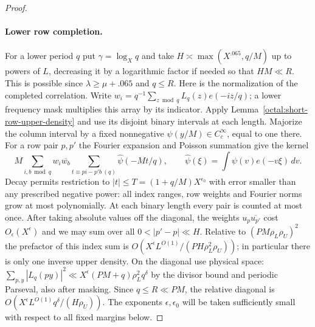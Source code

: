 \documentclass[11pt,a4paper]{article}
\theoremstyle{paperplain}
\numberwithin{equation}{section}
\begin{document}
\begin{proof}
\paragraph{Lower row completion.}
For a lower period $q$ put $\gamma=\log_X q$ and take
$H\asymp\max(X^{.065},q/M)$ up to powers of $L$, decreasing
it by a logarithmic factor if needed so that $HM\ll R$.
This is possible since $\lambda\ge\mu+.065$ and $q\le R$.
Here is the normalization of the completed correlation. Write
$w_i=q^{-1}\sum_{z\bmod q}L_q(z)e(-iz/q)$; a lower frequency mask
multiplies this array by its indicator. Apply
Lemma~\ref{octal:short-row-upper-density} and use its disjoint binary
intervals at each length. Majorize the column interval by a fixed
nonnegative $\psi(y/M)\in C_c^\infty$, equal to one there. For a row
pair $p,p'$ the Fourier expansion and Poisson summation give the kernel
\[
 M\sum_{i,b\bmod q}w_i\overline{w_b}
   \sum_{t\equiv pi-p'b\ (q)}\widehat\psi(-Mt/q),\qquad
 \widehat\psi(\xi)=\int\psi(v)e(-v\xi)\,dv .
\]
Decay permits restriction to $|t|\le T=(1+q/M)X^{\epsilon_0}$ with
error smaller than any prescribed negative power: all index ranges,
row weights and Fourier norms grow at most polynomially. At each
binary length every pair is counted at most once. After taking absolute
values off the diagonal, the weights $u_p\overline{u_{p'}}$ cost
$O_\epsilon(X^\epsilon)$ and we may sum over all $0<|p'-p|\ll H$.
Relative to $(PM\rho_L\rho_U)^2$ the prefactor of this index sum is
$O(X^\epsilon L^{O(1)}/(PH\rho_L^2\rho_U))$; in particular there is
only one inverse upper density. On the diagonal use physical space:
$\sum_{p,y}|L_q(py)|^2\ll X^\epsilon(PM+q)\rho_L^2q^\delta$
by the divisor bound and periodic Parseval, also after masking. Since
$q\le R\ll PM$, the relative diagonal is
$O(X^\epsilon L^{O(1)}q^\delta/(H\rho_U))$.
The exponents $\epsilon,\epsilon_0$ will be taken sufficiently
small with respect to all fixed margins below.


\end{proof}
\end{document}
